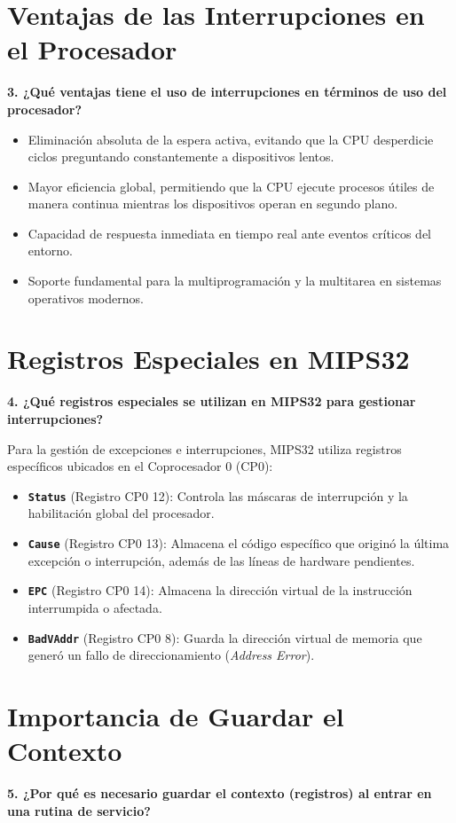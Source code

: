 \documentclass[12pt,a4paper]{article}
\begin{document}
\section{Ventajas de las Interrupciones en el Procesador} 
\textbf{3. ¿Qué ventajas tiene el uso de interrupciones en términos de uso del procesador?}

\begin{itemize}
    \item Eliminación absoluta de la espera activa, evitando que la CPU desperdicie ciclos preguntando constantemente a dispositivos lentos. 
    \item Mayor eficiencia global, permitiendo que la CPU ejecute procesos útiles de manera continua mientras los dispositivos operan en segundo plano. 
    \item Capacidad de respuesta inmediata en tiempo real ante eventos críticos del entorno. 
    \item Soporte fundamental para la multiprogramación y la multitarea en sistemas operativos modernos. 
\end{itemize}


\section{Registros Especiales en MIPS32} 
\textbf{4. ¿Qué registros especiales se utilizan en MIPS32 para gestionar interrupciones?} 

Para la gestión de excepciones e interrupciones, MIPS32 utiliza registros específicos ubicados en el Coprocesador 0 (CP0): 
\begin{itemize}
    \item \textbf{\texttt{Status}} (Registro CP0 12): Controla las máscaras de interrupción y la habilitación global del procesador. 
    \item \textbf{\texttt{Cause}} (Registro CP0 13): Almacena el código específico que originó la última excepción o interrupción, además de las líneas de hardware pendientes. 
    \item \textbf{\texttt{EPC}} (Registro CP0 14): Almacena la dirección virtual de la instrucción interrumpida o afectada. 
    \item \textbf{\texttt{BadVAddr}} (Registro CP0 8): Guarda la dirección virtual de memoria que generó un fallo de direccionamiento (\textit{Address Error}). 
\end{itemize}


\section{Importancia de Guardar el Contexto} 
\textbf{5. ¿Por qué es necesario guardar el contexto (registros) al entrar en una rutina de servicio?} 
\end{document}
